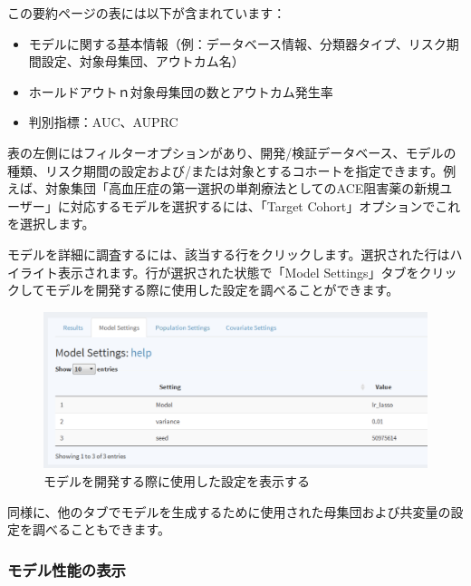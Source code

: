 \documentclass[
  11pt]{book}
\providecommand{\tightlist}{%
  \setlength{\itemsep}{0pt}\setlength{\parskip}{0pt}}
\theoremstyle{definition}
\theoremstyle{definition}
\theoremstyle{definition}
\theoremstyle{definition}
\theoremstyle{remark}
\begin{document}
この要約ページの表には以下が含まれています：

\begin{itemize}
\tightlist
\item
  モデルに関する基本情報（例：データベース情報、分類器タイプ、リスク期間設定、対象母集団、アウトカム名）
\item
  ホールドアウトｎ対象母集団の数とアウトカム発生率
\item
  判別指標：AUC、AUPRC
\end{itemize}

表の左側にはフィルターオプションがあり、開発/検証データベース、モデルの種類、リスク期間の設定および/または対象とするコホートを指定できます。例えば、対象集団「高血圧症の第一選択の単剤療法としてのACE阻害薬の新規ユーザー」に対応するモデルを選択するには、「Target Cohort」オプションでこれを選択します。

モデルを詳細に調査するには、該当する行をクリックします。選択された行はハイライト表示されます。行が選択された状態で「Model Settings」タブをクリックしてモデルを開発する際に使用した設定を調べることができます。

\begin{figure}

{\centering \includegraphics[width=1\linewidth]{images/PatientLevelPrediction/shiny/shinyModel} 

}

\caption{モデルを開発する際に使用した設定を表示する}\label{fig:shinyModel}
\end{figure}

同様に、他のタブでモデルを生成するために使用された母集団および共変量の設定を調べることもできます。

\subsubsection*{モデル性能の表示}\label{ux30e2ux30c7ux30ebux6027ux80fdux306eux8868ux793a}
\end{document}
